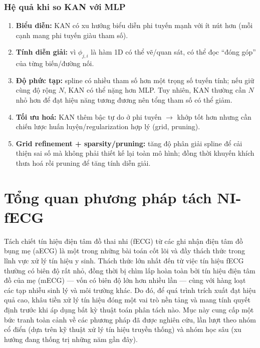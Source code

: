 \documentclass[../DoAn.tex]{subfiles}
\begin{document}
\subsubsection{Hệ quả khi so KAN với MLP}
\begin{enumerate}
  \item \textbf{Biểu diễn:} KAN có xu hướng biểu diễn phi tuyến mạnh với ít nút hơn (mỗi cạnh mang phi tuyến giàu tham số).
  \item \textbf{Tính diễn giải:} vì $\phi_{j,i}$ là hàm 1D có thể vẽ/quan sát, có thể đọc ``đóng góp'' của từng biến/đường nối.
  \item \textbf{Độ phức tạp:} spline có nhiều tham số hơn một trọng số tuyến tính; nếu giữ cùng độ rộng $N$, KAN có thể nặng hơn MLP.
    Tuy nhiên, KAN thường cần $N$ nhỏ hơn để đạt hiệu năng tương đương nên tổng tham số có thể giảm.
  \item \textbf{Tối ưu hoá:} KAN thêm bậc tự do ở phi tuyến $\rightarrow$ khớp tốt hơn nhưng cần chiến lược huấn luyện/regularization hợp lý (grid, pruning).
  \item \textbf{Grid refinement + sparsity/pruning:} tăng độ phân giải spline để cải thiện sai số mà không phải thiết kế lại toàn mô hình; đồng thời khuyến khích thưa hoá rồi pruning để tăng tính diễn giải.
\end{enumerate}

\section{Tổng quan phương pháp tách NI-fECG}
\label{sec:related_methods}

Tách chiết tín hiệu điện tâm đồ thai nhi (fECG) từ các ghi nhận điện tâm đồ bụng mẹ (aECG) là một trong những bài toán cốt lõi và đầy thách thức trong lĩnh vực xử lý tín hiệu y sinh. Thách thức lớn nhất đến từ việc tín hiệu fECG thường có biên độ rất nhỏ, đồng thời bị chìm lấp hoàn toàn bởi tín hiệu điện tâm đồ của mẹ (mECG) --- vốn có biên độ lớn hơn nhiều lần --- cùng với hàng loạt các tạp nhiễu sinh lý và môi trường khác. Do đó, để quá trình trích xuất đạt hiệu quả cao, khâu tiền xử lý tín hiệu đóng một vai trò nền tảng và mang tính quyết định trước khi áp dụng bất kỳ thuật toán phân tách nào. Mục này cung cấp một bức tranh toàn cảnh về các phương pháp đã được nghiên cứu, lần lượt theo nhóm cổ điển (dựa trên kỹ thuật xử lý tín hiệu truyền thống) và nhóm học sâu (xu hướng đang thống trị những năm gần đây).
\end{document}

